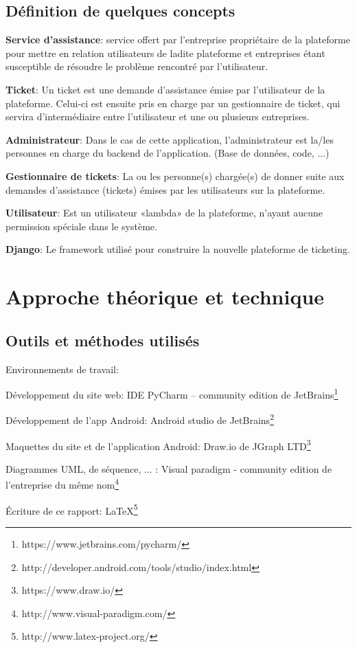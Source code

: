 \documentclass[12pt,table,a4paper]{report}
\begin{document}
\section{Définition de quelques concepts}
\textbf{Service d'assistance}: service offert par l'entreprise propriétaire de la plateforme pour mettre en relation utilisateurs de ladite plateforme et entreprises étant susceptible de résoudre le problème rencontré par l'utilisateur.

\textbf{Ticket}: Un ticket est une demande d'assistance émise par l'utilisateur de la plateforme. Celui-ci est ensuite pris en charge par un gestionnaire de ticket, qui servira d'intermédiaire entre l'utilisateur et une ou plusieurs entreprises.

\textbf{Administrateur}: Dans le cas de cette application, l'administrateur est la/les personnes en charge du backend de l'application. (Base de données, code, ...)

\textbf{Gestionnaire de tickets}: La ou les personne(s) chargée(s) de donner suite aux demandes d'assistance (tickets) émises par les utilisateurs sur la plateforme.

\textbf{Utilisateur}: Est un utilisateur «lambda» de la plateforme, n'ayant aucune permission spéciale dans le système.

\textbf{Django}: Le framework utilisé pour construire la nouvelle plateforme de ticketing.


\chapter{Approche théorique et technique}
\section{Outils et méthodes utilisés}
Environnements de travail:

Développement du site web: IDE PyCharm – community edition de JetBrains\footnote{https://www.jetbrains.com/pycharm/}

Développement de l'app Android: Android studio de JetBrains\footnote{http://developer.android.com/tools/studio/index.html}

Maquettes du site et de l'application Android: Draw.io de JGraph LTD\footnote{https://www.draw.io/}

Diagrammes UML, de séquence, ... : Visual paradigm - community edition de l'entreprise du même nom\footnote{http://www.visual-paradigm.com/}

Écriture de ce rapport: LaTeX\footnote{http://www.latex-project.org/}
\end{document}
